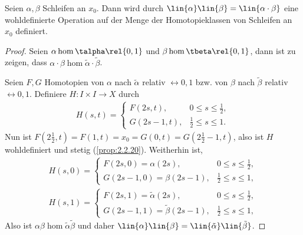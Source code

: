 \begin{prop}
\label{prop:3.2.1}
Seien $\alpha,\beta$ Schleifen an $x_0$. Dann wird durch
$\lin{\alpha}\lin{\beta} = \lin{\alpha\cdot\beta}$ eine wohldefinierte
Operation auf der Menge der Homotopieklassen von Schleifen an $x_0$
definiert.\fishhere
\end{prop}
\begin{proof}
Seien $\alpha\hom\talpha\rel{0,1}$ und
$\beta\hom\tbeta\rel{0,1}$, dann ist zu zeigen, dass $\alpha\cdot\beta
\hom \tilde{\alpha}\cdot\tilde{\beta}$.

Seien $F,G$ Homotopien von $\alpha$ nach $\tilde{\alpha}$ relativ $\rel{0,1}$
bzw. von $\beta$ nach $\tilde{\beta}$ relativ $\rel{0,1}$. Definiere $H: I\times
I\to X$ durch
\begin{align*}
H(s,t) = \begin{cases}
         F(2s,t), & 0\le s\le \frac{1}{2},\\
         G(2s-1,t), & \frac{1}{2} \le s \le 1.
         \end{cases}
\end{align*}
Nun ist $F(2\frac{1}{2},t) = F(1,t) = x_0 = G(0,t) = G(2\frac{1}{2}-1,t)$, also
ist $H$ wohldefiniert und stetig (\ref{prop:2.2.20}). Weitherhin ist,
\begin{align*}
H(s,0) = \begin{cases}
         F(2s,0) = \alpha(2s), & 0\le s\le \frac{1}{2},\\
         G(2s-1,0) = \beta(2s-1), & \frac{1}{2} \le s \le 1,
         \end{cases}\\
H(s,1) = \begin{cases}
         F(2s,1) = \tilde{\alpha}(2s), & 0\le s\le \frac{1}{2},\\
         G(2s-1,1) = \tilde{\beta}(2s-1), & \frac{1}{2} \le s \le 1,
         \end{cases}
\end{align*}
Also ist $\alpha\beta \hom \tilde{\alpha}\tilde{\beta}$ und daher
$\lin{\alpha}\lin{\beta} = \lin{\tilde{\alpha}}\lin{\tilde{\beta}}$.\qedhere
\end{proof}

